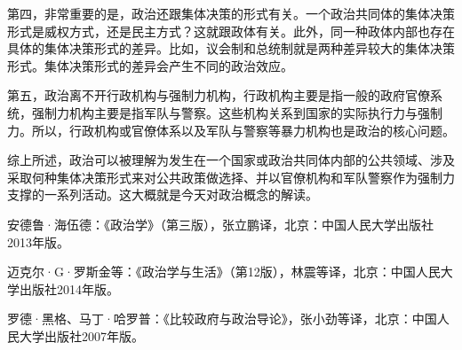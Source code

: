 第四，非常重要的是，政治还跟集体决策的形式有关。一个政治共同体的集体决策形式是威权方式，还是民主方式？这就跟政体有关。此外，同一种政体内部也存在具体的集体决策形式的差异。比如，议会制和总统制就是两种差异较大的集体决策形式。集体决策形式的差异会产生不同的政治效应。

第五，政治离不开行政机构与强制力机构，行政机构主要是指一般的政府官僚系统，强制力机构主要是指军队与警察。这些机构关系到国家的实际执行力与强制力。所以，行政机构或官僚体系以及军队与警察等暴力机构也是政治的核心问题。

综上所述，政治可以被理解为发生在一个国家或政治共同体内部的公共领域、涉及采取何种集体决策形式来对公共政策做选择、并以官僚机构和军队警察作为强制力支撑的一系列活动。这大概就是今天对政治概念的解读。


安德鲁·海伍德：《政治学》（第三版），张立鹏译，北京：中国人民大学出版社2013年版。

迈克尔·G·罗斯金等：《政治学与生活》（第12版），林震等译，北京：中国人民大学出版社2014年版。

罗德·黑格、马丁·哈罗普：《比较政府与政治导论》，张小劲等译，北京：中国人民大学出版社2007年版。
